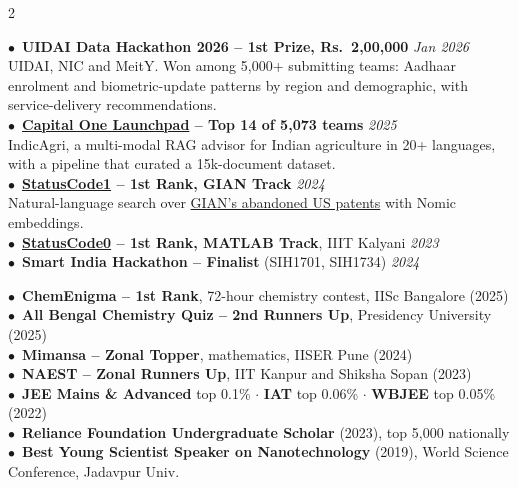 \documentclass[a4paper,10.5pt]{extarticle}
\newcommand{\subhead}[1]{\vspace{1pt}{\normalsize\bfseries #1}\par\vspace{1pt}}
\begin{document}
\begin{paracol}{2}
\subhead{Hackathons}
{\small
$\bullet$~\textbf{UIDAI Data Hackathon 2026 -- 1st Prize, Rs.~2,00,000} \href{https://event.data.gov.in/challenge/uidai-data-hackathon-2026/}{\faGlobe} \hfill \textit{Jan 2026}\\
\hspace*{0.8em}UIDAI, NIC and MeitY. Won among 5,000+ submitting teams: Aadhaar enrolment and biometric-update patterns by region and demographic, with service-delivery recommendations.\\[2.5pt]
$\bullet$~\textbf{\href{https://capitalone.hackerearth.com/}{Capital One Launchpad} -- Top 14 of 5,073 teams} \href{https://github.com/Shuvam-Banerji-Seal/Answering_Agriculture}{\faGithub} \hfill \textit{2025}\\
\hspace*{0.8em}IndicAgri, a multi-modal RAG advisor for Indian agriculture in 20+ languages, with a pipeline that curated a 15k-document dataset.\\[2.5pt]
$\bullet$~\textbf{\href{https://statuscode-1.devfolio.co/}{StatusCode1} -- 1st Rank, GIAN Track} \href{https://github.com/Shuvam-Banerji-Seal/LLM-based-Searcher-for-GIAN-s-Abandoned-US-Patents}{\faGithub} \hfill \textit{2024}\\
\hspace*{0.8em}Natural-language search over \href{https://gian.org/abandoned-us-patents/}{GIAN's abandoned US patents} with Nomic embeddings.\\[2.5pt]
$\bullet$~\textbf{\href{https://statuscode0.devfolio.co/}{StatusCode0} -- 1st Rank, MATLAB Track}, IIIT Kalyani \hfill \textit{2023}\\[2.5pt]
$\bullet$~\textbf{Smart India Hackathon -- Finalist} (SIH1701, SIH1734) \hfill \textit{2024}
}

\subhead{Competitions, Examinations \& Honours}
{\small
$\bullet$~\textbf{ChemEnigma -- 1st Rank}, 72-hour chemistry contest, IISc Bangalore (2025)\\
$\bullet$~\textbf{All Bengal Chemistry Quiz -- 2nd Runners Up}, Presidency University (2025)\\
$\bullet$~\textbf{Mimansa -- Zonal Topper}, mathematics, IISER Pune (2024)\\
$\bullet$~\textbf{NAEST -- Zonal Runners Up}, IIT Kanpur and Shiksha Sopan (2023)\\
$\bullet$~\textbf{JEE Mains \& Advanced} top 0.1\% $\cdot$ \textbf{IAT} top 0.06\% $\cdot$ \textbf{WBJEE} top 0.05\% (2022)\\
$\bullet$~\textbf{Reliance Foundation Undergraduate Scholar} (2023), top 5,000 nationally\\
$\bullet$~\textbf{Best Young Scientist Speaker on Nanotechnology} (2019), World Science Conference, Jadavpur Univ.
}


\end{paracol}
\end{document}
